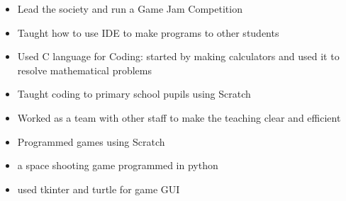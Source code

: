 


 
\vspace{4mm}

\begin{itemize}

\item Lead the society and run a Game Jam Competition
\item Taught how to use IDE to make programs to other students
\item Used C language for Coding: started by making calculators and used it to resolve mathematical problems

\vspace{-3mm}
\end{itemize}

\divider


\begin{itemize}

\item Taught coding to primary school pupils using Scratch
\item Worked as a team with other staff to make the teaching clear and efficient
\item Programmed games using Scratch

\end{itemize}


\vspace{-3mm}
\begin{itemize}

\item a space shooting game programmed in python
\item used tkinter and turtle for game GUI

\end{itemize}

